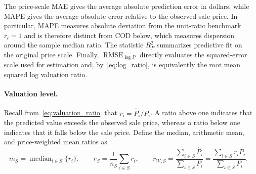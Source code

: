 \documentclass[10pt]{article}
\theoremstyle{definition}
\newcommand{\1}{\mathbf{1}}
\begin{document}
{The price-scale MAE gives the average absolute prediction error in dollars, while MAPE gives the average absolute error relative to the observed sale price. In particular, MAPE measures absolute deviation from the unit-ratio benchmark $r_i=1$ and is therefore distinct from COD below, which measures dispersion around the sample median ratio. The statistic $R^2_P$ summarizes predictive fit on the original price scale. Finally, $\operatorname{RMSE}_{\log P}$ directly evaluates the squared-error scale used for estimation and, by~\eqref{eq:log_ratio}, is equivalently the root mean squared log valuation ratio.}


\paragraph{Valuation level.}
Recall from~\eqref{eq:valuation_ratio} that $r_i=\widehat P_i/P_i$. A ratio above one indicates that the predicted value exceeds the observed sale price, whereas a ratio below one indicates that it falls below the sale price. Define the median, arithmetic mean, and price-weighted mean ratios as
\begin{equation}
\label{eq:level_ratios}
m_S
=
\operatorname{median}_{i\in S}\{r_i\},
\qquad
\bar r_S
=
\frac{1}{n_S}\sum_{i\in S}r_i,
\qquad
\bar r_{W,S}
=
\frac{\sum_{i\in S}\widehat P_i}{\sum_{i\in S}P_i}
=
\frac{\sum_{i\in S}r_iP_i}{\sum_{i\in S}P_i}.
\end{equation}
\end{document}
